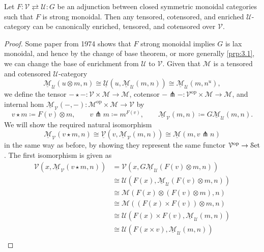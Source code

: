 \begin{theorem}\label{thm:3.1}
	Let $F : \mathcal{V} \rightleftarrows \mathcal{U} : G$ be an adjunction between closed symmetric monoidal categories such that $F$ is strong monoidal. Then any tensored, cotensored, and enriched $\mathcal{U} $-category can be canonically enriched, tensored, and cotensored over $\mathcal{V} $.
\end{theorem}
\begin{proof}
	Some paper from 1974 shows that $F$ strong monoidal implies $G$ is lax monoidal, and hence by the change of base theorem, or more generally \cref{prp:3.1}, we can change the base of enrichment from $\mathcal{U}$ to $\mathcal{V}$. Given that $\mathcal{M} $ is a tensored and cotensored $\mathcal{U} $-category
	\[
		\underline{\mathcal{M} } _\mathcal{U} (u\otimes m,n)\cong \underline{\mathcal{U} } (u,\underline{\mathcal{M} } _\mathcal{U} (m,n))\cong \underline{\mathcal{M} } _\mathcal{U} (m,n^u),
	\]
	we define the tensor $-\star -: \mathcal{V} \times \mathcal{M}  \to \mathcal{M} $, cotensor $-\pitchfork- : \mathcal{V} ^{\mathrm{op}} \times \mathcal{M}  \to \mathcal{M} $, and internal hom $\underline{\mathcal{M} } _\mathcal{V} (-,-): \mathcal{M} ^{\mathrm{op}} \times \mathcal{M}  \to \mathcal{V} $ by
	\[
		v\star m \coloneqq F(v)\otimes m,\qquad v\pitchfork m\coloneqq  m^{F(v)} ,\qquad \underline{\mathcal{M} } _\mathcal{V} (m,n)\coloneqq G\underline{\mathcal{M} } _\mathcal{U} (m,n)
	.\]
	We will show the required natural isomorphism
	\[
		\underline{\mathcal{M} } _\mathcal{V} (v\star m,n)\cong \underline{\mathcal{V} } (v,\underline{\mathcal{M} } _\mathcal{V} (m,n))\cong \underline{\mathcal{M} } (m,v\pitchfork n )
	\]
	in the same way as before, by showing they represent the same functor $\mathcal{V} ^{\mathrm{op}} \to \mathcal{S}\mathrm{et} $. The first isomorphism is given as
	\begin{align*}
		\mathcal{V} (x,\underline{\mathcal{M} } _\mathcal{V} (v\star m,n))&=\mathcal{V} (x,G\underline{\mathcal{M} } _\mathcal{U} (F(v)\otimes m,n))\\
										  &\cong \mathcal{U} (F(x),\underline{\mathcal{M} } _\mathcal{U} (F(v)\otimes m,n))\\
										  &\cong \mathcal{M} (F(x)\otimes (F(v)\otimes m),n)\\
										  &\cong \mathcal{M} ((F(x)\times F(v))\otimes m,n)\\
										  &\cong \mathcal{U} (F(x)\times F(v),\underline{\mathcal{M} } _\mathcal{U} (m,n))\\
										  &\cong \mathcal{U} (F(x\times v),\underline{\mathcal{M} } _\mathcal{U} (m,n))\\

\end{align*}
\end{proof}
